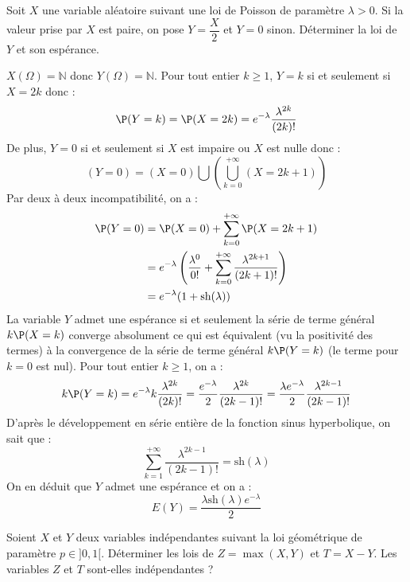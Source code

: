 \documentclass[a4paper,10pt]{report}
\begin{document}
\begin{Exercice}{} Soit $X$ une variable aléatoire suivant une loi de Poisson de paramètre $\lambda>0$. Si la valeur prise par $X$ est paire, on pose $Y = \dfrac{X}{2}$ et $Y=0$ sinon. Déterminer la loi de $Y$ et son espérance.
\end{Exercice}

\corr $X(\Omega) = \mathbb{N}$ donc $Y(\Omega)= \mathbb{N}$. Pour tout entier $k \geq 1$, $Y=k$ si et seulement si $X=2k$ donc :
$$ \P(Y=k) = \P(X=2k) = e^{- \lambda} \dfrac{\lambda^{2k}}{(2k)!}$$
De plus, $Y=0$ si et seulement si $X$ est impaire ou $X$ est nulle donc :
$$ (Y=0) = (X=0) \bigcup \left( \bigcup_{k=0}^{+ \infty} (X=2k+1) \right)$$
Par deux à deux incompatibilité, on a :
\begin{align*}
\P(Y=0) & = \P(X=0) + \sum_{k=0}^{+ \infty} \P(X=2k+1) \\
& = e^{- \lambda} \left( \dfrac{\lambda^0}{0!} + \sum_{k=0}^{+ \infty} \dfrac{\lambda^{2k+1}}{(2k+1)!} \right) \\
& = e^{- \lambda}( 1 + \textrm{sh}(\lambda))
\end{align*}
La variable $Y$ admet une espérance si et seulement la série de terme général $k \P(X=k)$ converge absolument ce qui est équivalent (vu la positivité des termes) à la convergence de la série de terme général $k\P(Y=k)$ (le terme pour $k=0$ est nul).  Pour tout entier $k \geq 1$, on a :
$$ k \P(Y=k) = e^{- \lambda} k \dfrac{\lambda^{2k}}{(2k)!} =\dfrac{e^{-\lambda}}{2} \dfrac{\lambda^{2k}}{(2k-1)!} = \dfrac{ \lambda e^{-\lambda}}{2} \dfrac{\lambda^{2k-1}}{(2k-1)!}$$
D'après le développement en série entière de la fonction sinus hyperbolique, on sait que :
$$ \sum_{k=1}^{+ \infty}  \dfrac{\lambda^{2k-1}}{(2k-1)!} = \textrm{sh}(\lambda)$$
On en déduit que $Y$ admet une espérance et on a :
$$ E(Y) = \dfrac{ \lambda \textrm{sh}(\lambda) e^{-\lambda}}{2}$$

\begin{Exercice}{} Soient $X$ et $Y$ deux variables indépendantes suivant la loi géométrique de paramètre $p \in ]0,1[$. Déterminer les lois de $Z= \max(X,Y)$ et $T=X-Y$. Les variables $Z$ et $T$ sont-elles indépendantes ?
\end{Exercice}
\end{document}
